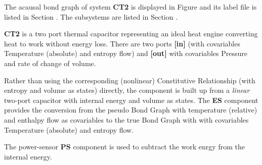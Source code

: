 

   The acausal bond graph of system \textbf{CT2} is
   displayed in Figure  and its label
   file is listed in Section .
   The subsystems are listed in Section .

\textbf{CT2} is a two port thermal capacitor representing an ideal
heat engine converting heat to work without energy loss. There are two
ports {\bf [in]} (with covariables Temperature (absolute) and
entropy flow) and {\bf [out]} with covariables Pressure and rate of
change of volume. 

Rather than using the corresponding (nonlinear) Constitutive
Relationship (with entropy and volume as states) directly, the
component is built up from a {\em linear\/} two-port capacitor with
internal energy and volume as states. The {\bf ES} component provides
the conversion from the pseudo Bond Graph with temperature (relative)
and enthalpy flow as covariables to the true Bond Graph with with
covariables Temperature (absolute) and entropy flow.

The power-sensor {\bf PS} component is used to subtract the work enrgy
from the internal energy.







